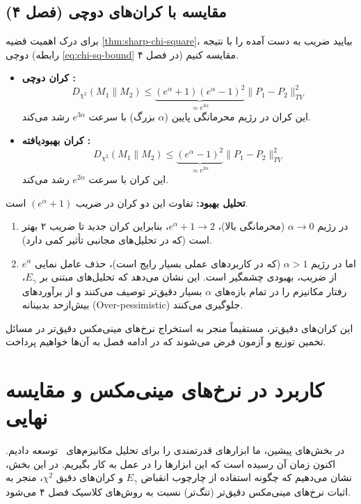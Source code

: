 \subsection{مقایسه با کران‌های دوچی (فصل ۴)}
برای درک اهمیت قضیه \ref{thm:sharp-chi-square}، بیایید ضریب به دست آمده را با نتیجه دوچی (رابطه \ref{eq:chi-sq-bound} در فصل ۴) مقایسه کنیم.

\begin{itemize}
    \item \textbf{کران دوچی :}
    $$ D_{\chi^2}(M_1 \| M_2) \le \underbrace{(e^\alpha + 1)(e^\alpha - 1)^2}_{\approx e^{3\alpha}} \|P_1 - P_2\|_{TV}^2 $$
    این کران در رژیم محرمانگی پایین ($\alpha$ بزرگ) با سرعت $e^{3\alpha}$ رشد می‌کند.
    
    \item \textbf{کران بهبودیافته :}
    $$ D_{\chi^2}(M_1 \| M_2) \le \underbrace{(e^\alpha - 1)^2}_{\approx e^{2\alpha}} \|P_1 - P_2\|_{TV}^2 $$
    این کران با سرعت $e^{2\alpha}$ رشد می‌کند.
\end{itemize}

\textbf{تحلیل بهبود:}
تفاوت این دو کران در ضریب $(e^\alpha + 1)$ است.
\begin{enumerate}
    \item در رژیم $\alpha \to 0$ (محرمانگی بالا)، $e^\alpha + 1 \to 2$، بنابراین کران جدید تا ضریب ۲ بهتر است (که در تحلیل‌های مجانبی تأثیر کمی دارد).
    \item اما در رژیم $\alpha > 1$ (که در کاربردهای عملی بسیار رایج است)، حذف عامل نمایی $e^\alpha$ از ضریب، بهبودی چشمگیر است. این نشان می‌دهد که تحلیل‌های مبتنی بر $E_\gamma$، رفتار مکانیزم را در تمام بازه‌های $\alpha$ بسیار دقیق‌تر توصیف می‌کنند و از برآوردهای بیش‌از‌حد بدبینانه (Over-pessimistic) جلوگیری می‌کنند.
\end{enumerate}

این کران‌های دقیق‌تر، مستقیماً منجر به استخراج نرخ‌های مینی‌مکس دقیق‌تر در مسائل تخمین توزیع و آزمون فرض می‌شوند که در ادامه فصل به آن‌ها خواهیم پرداخت.


\section{کاربرد در نرخ‌های مینی‌مکس و مقایسه نهایی}
\label{sec:egamma:applications}

در بخش‌های پیشین، ما ابزارهای قدرتمندی را برای تحلیل مکانیزم‌های \LDP\ توسعه دادیم. اکنون زمان آن رسیده است که این ابزارها را در عمل به کار بگیریم. در این بخش، نشان می‌دهیم که چگونه استفاده از چارچوب انقباض $E_\gamma$ و کران‌های دقیق $\chi^2$، منجر به اثبات نرخ‌های مینی‌مکس دقیق‌تر (تنگ‌تر) نسبت به روش‌های کلاسیک فصل ۴ می‌شود.

